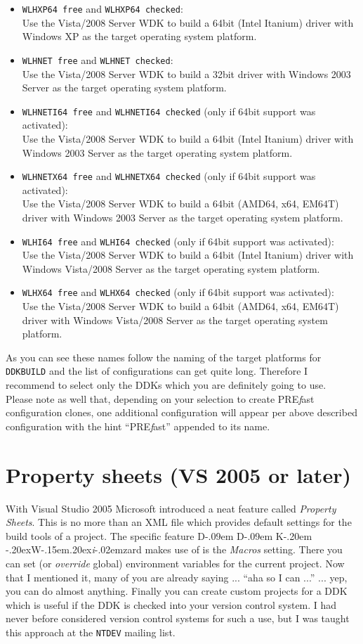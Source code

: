 \documentclass[a4paper,titlepage]{report}
\def\ddkwiz{D\kern-.09em D\kern-.09em K\kern-.20em \raise-.20ex\hbox{W}\kern-.15em\raise.20ex\hbox{\it{i}}\kern-.02em{zard}}
\newcommand{\prefast}[0]{\textsf{PRE\textsl{f}ast}}
\newcommand{\solcfg}[2]{\texttt{#1 free} and \texttt{#1 checked}:\\#2}
\newcommand{\solcfgsixfour}[2]{\texttt{#1 free} and \texttt{#1 checked} \textcolor[gray]{0.40}{\textsf{\small(only if 64bit support was activated)}}:\\#2}
\begin{document}
\begin{itemize}
  \item \solcfg{WLHXP64}{Use the Vista/2008 Server WDK to build a 64bit (Intel Itanium) driver with Windows XP as the target operating system platform.}
  \item \solcfg{WLHNET}{Use the Vista/2008 Server WDK to build a 32bit driver with Windows 2003 Server as the target operating system platform.}
  \item \solcfgsixfour{WLHNETI64}{Use the Vista/2008 Server WDK to build a 64bit (Intel Itanium) driver with Windows 2003 Server as the target operating system platform.}
  \item \solcfgsixfour{WLHNETX64}{Use the Vista/2008 Server WDK to build a 64bit (AMD64, x64, EM64T) driver with Windows 2003 Server as the target operating system platform.}
  \item \solcfgsixfour{WLHI64}{Use the Vista/2008 Server WDK to build a 64bit (Intel Itanium) driver with Windows Vista/2008 Server as the target operating system platform.}
  \item \solcfgsixfour{WLHX64}{Use the Vista/2008 Server WDK to build a 64bit (AMD64, x64, EM64T) driver with Windows Vista/2008 Server as the target operating system platform.}
\end{itemize}

As you can see these names follow the naming of the target platforms for \texttt{DDKBUILD}
and the list of configurations can get quite long. Therefore I recommend to select only
the DDKs which you are definitely going to use.\\

Please note as well that, depending on your selection to create \prefast{} configuration
clones, one additional configuration will appear per above described configuration
with the hint ``\prefast{}'' appended to its name.

\section{Property sheets (VS 2005 or later)}
\label{sec:propsheets}
With Visual Studio 2005 Microsoft introduced a neat feature called \emph{Property Sheets}.
This is no more than an XML file which provides default settings for the build tools
of a project. The specific feature \ddkwiz{} makes use of is the \emph{Macros}
setting. There you can set (or \emph{override} global) environment variables for the
current project. Now that I mentioned it, many of you are already saying ... ``aha
so I can ...'' ... yep, you can do almost anything. Finally you can create custom
projects for a DDK which is useful if the DDK is checked into your version control
system. I had never before considered version control systems for such a use, but
I was taught this approach at the \texttt{NTDEV} mailing list.
\end{document}
